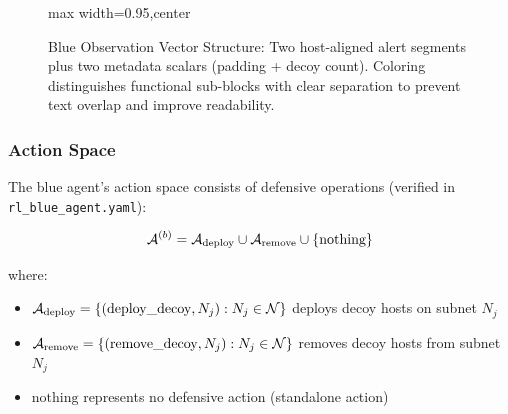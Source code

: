 \documentclass[12pt,oneside,a4paper]{article}
\theoremstyle{definition}
\theoremstyle{plain}
\begin{document}
\begin{figure}[H]
\begin{adjustbox}{max width=0.95\linewidth,center}
\end{adjustbox}
\caption{Blue Observation Vector Structure: Two host-aligned alert segments plus two metadata scalars (padding + decoy count). Coloring distinguishes functional sub-blocks with clear separation to prevent text overlap and improve readability.}
\label{fig:observation_vector}
\end{figure}

\subsubsection{Action Space}
The blue agent's action space consists of defensive operations (verified in \texttt{rl\_blue\_agent.yaml}):

\begin{equation}
\mathcal{A}^{(b)} = \mathcal{A}_{\text{deploy}} \cup \mathcal{A}_{\text{remove}} \cup \{\text{nothing}\}
\end{equation}

where:
\begin{itemize}
    \item $\mathcal{A}_{\text{deploy}} = \{(\text{deploy\_decoy}, N_j) : N_j \in \mathcal{N}\}$ deploys decoy hosts on subnet $N_j$
    \item $\mathcal{A}_{\text{remove}} = \{(\text{remove\_decoy}, N_j) : N_j \in \mathcal{N}\}$ removes decoy hosts from subnet $N_j$
    \item $\text{nothing}$ represents no defensive action (standalone action)
\end{itemize}
\end{document}
